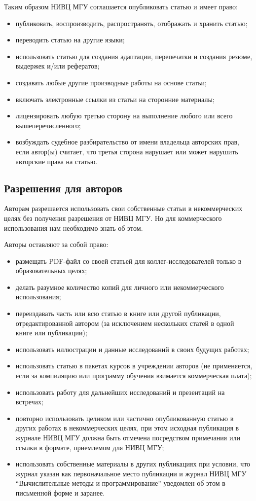 \documentclass[10pt,a4paper]{book}
\begin{document}
Таким образом НИВЦ МГУ соглашается опубликовать статью и имеет право:
\begin{itemize}[itemsep=0pt,parsep=2pt,topsep=2pt,partopsep=0pt]
\item публиковать, воспроизводить, распространять, отображать и хранить статью;
\item переводить статью на другие языки;
\item использовать статью для создания адаптации, перепечатки и создания резюме, 
      выдержек и/или рефератов;
\item создавать любые другие производные работы на основе статьи;
\item включать электронные ссылки из статьи на сторонние материалы;
\item лицензировать любую третью сторону на выполнение любого или всего вышеперечисленного;
\item возбуждать судебное разбирательство от имени владельца авторских прав, если автор(ы)
      считает, что третья сторона нарушает или может нарушить авторские права на статью.
\end{itemize}

\subsection{Разрешения для авторов} 
Авторам разрешается использовать свои собственные статьи в некоммерческих целях без получения разрешения от НИВЦ МГУ. Но для коммерческого использования нам необходимо знать об этом.

Авторы оставляют за собой право:
\begin{itemize}[itemsep=0pt,parsep=2pt,topsep=2pt,partopsep=0pt]
\item размещать PDF-файл со своей статьей для коллег-исследователей только в
      образовательных целях;
\item делать разумное количество копий для личного или некоммерческого использования;
\item переиздавать часть или всю статью в книге или другой публикации, отредактированной
      автором (за исключением нескольких статей в одной книге или публикации);
\item использовать иллюстрации и данные исследований в своих будущих работах;
\item использовать статью в пакетах курсов в учреждении авторов (не применяется, если за
      компиляцию или программу обучения взимается коммерческая плата);
\item использовать работу для дальнейших исследований и презентаций на встречах;
\item повторно использовать целиком или частично опубликованную статью в других работах в
      некоммерческих целях, при этом исходная публикация в журнале НИВЦ МГУ должна быть
      отмечена посредством примечания или ссылки в формате, приемлемом для НИВЦ МГУ;
\item использовать собственные материалы в других публикациях при условии, что журнал
      указан как первоначальное место публикации и журнал НИВЦ МГУ ``Вычислительные методы
      и программирование'' уведомлен об этом в письменной форме и заранее.
\end{itemize}
\end{document}
